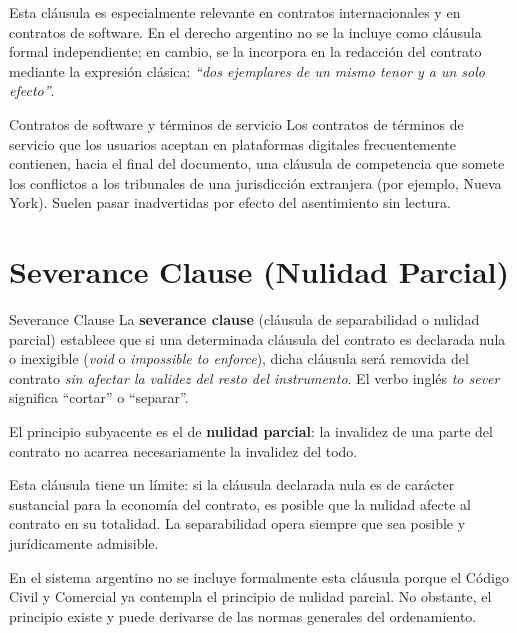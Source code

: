 \documentclass[12pt,oneside]{book}
\begin{document}
Esta cláusula es especialmente relevante en contratos internacionales y en
contratos de software. En el derecho argentino no se la incluye como
cláusula formal independiente; en cambio, se la incorpora en la redacción
del contrato mediante la expresión clásica: \textit{``dos ejemplares de un
mismo tenor y a un solo efecto''}.

\begin{example}{Contratos de software y términos de servicio}
Los contratos de términos de servicio que los usuarios aceptan en plataformas
digitales frecuentemente contienen, hacia el final del documento, una cláusula
de competencia que somete los conflictos a los tribunales de una jurisdicción
extranjera (por ejemplo, Nueva York). Suelen pasar inadvertidas por efecto del
asentimiento sin lectura.
\end{example}

\section{Severance Clause (Nulidad Parcial)}

\begin{definition}{Severance Clause}
La \textbf{severance clause} (cláusula de separabilidad o nulidad parcial)
establece que si una determinada cláusula del contrato es declarada nula
o inexigible (\textit{void} o \textit{impossible to enforce}), dicha
cláusula será removida del contrato \emph{sin afectar la validez del
resto del instrumento}. El verbo inglés \textit{to sever} significa
``cortar'' o ``separar''.
\end{definition}

El principio subyacente es el de \textbf{nulidad parcial}: la invalidez de
una parte del contrato no acarrea necesariamente la invalidez del todo.

\begin{important}
Esta cláusula tiene un límite: si la cláusula declarada nula es de carácter
sustancial para la economía del contrato, es posible que la nulidad afecte
al contrato en su totalidad. La separabilidad opera siempre que sea posible
y jurídicamente admisible.
\end{important}

En el sistema argentino no se incluye formalmente esta cláusula porque el
Código Civil y Comercial ya contempla el principio de nulidad parcial. No
obstante, el principio existe y puede derivarse de las normas generales del
ordenamiento.

\end{document}
